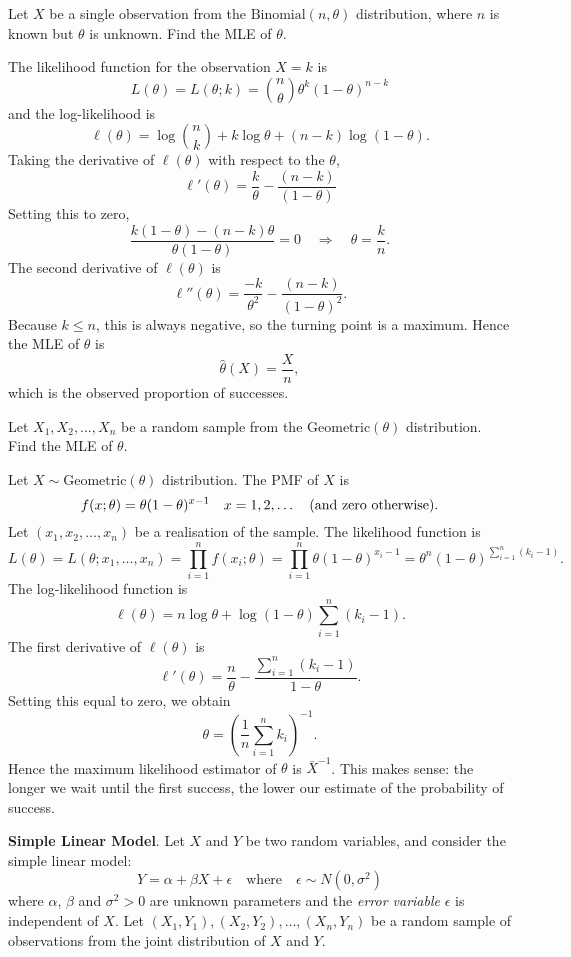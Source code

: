 \begin{exercise}
\begin{questions}
\question %
Let $X$ be a single observation from the $\text{Binomial}(n,\theta)$ distribution, where $n$ is known but $\theta$ is unknown. Find the MLE of $\theta$. 

\begin{answer}
The likelihood function for the observation $X=k$ is 
\[
L(\theta) = L(\theta; k) = \binom{n}{\theta} \theta^{k}(1 - \theta)^{n-k}
\]
and the log-likelihood is
\[
\ell(\theta) = \log \binom{n}{k} + k\log \theta + (n - k)\log(1 - \theta).
\]
Taking the derivative of $\ell(\theta)$ with respect to the $\theta$,
\[
\ell'(\theta) = \frac{k}{\theta} -\frac{(n-k)}{(1-\theta)} 
\]
Setting this to zero,
\[
\frac{k(1-\theta)-(n-k)\theta}{\theta(1-\theta)} = 0 \quad\Rightarrow\quad \theta=\frac{k}{n}.
\]
The second derivative of $\ell(\theta)$ is 
\[
\ell''(\theta) =  \frac{-k}{\theta^{2}} - \frac{(n-k)}{(1-\theta)^{2}}.
\]
Because $k\leq n$, this is always negative, so the turning point is a maximum. Hence the MLE of $\theta$ is 
\[
\hat{\theta}(X) = \frac{X}{n},
\]
which is the observed proportion of successes.
\end{answer}

\question %
Let $X_1,X_2,\ldots,X_n$ be a random sample from the $\text{Geometric}(\theta)$ distribution. Find the MLE of $\theta$. 
\begin{answer}
Let $X\sim\text{Geometric}(\theta)$ distribution. The PMF of $X$ is
\[
f(x;\theta) = \theta(1-\theta)^{x-1}\quad x = 1,2,\ldots \text{\quad (and zero otherwise).}
\]
Let $(x_1,x_2,\ldots,x_n)$ be a realisation of the sample. The likelihood function is
\[
L(\theta) = L(\theta;x_1,\ldots,x_n) 
	= \prod_{i=1}^n f(x_i;\theta)
	= \prod_{i=1}^n \theta(1-\theta)^{x_i-1}
	= \theta^n(1-\theta)^{\sum_{i=1}^{n}(k_i-1)}.
\]
The log-likelihood function is
\[
\ell(\theta) = n\log\theta +  \log(1-\theta)\sum_{i=1}^{n}(k_i-1).
\]
The first derivative of $\ell(\theta)$ is
\[
\ell'(\theta) = \frac{n}{\theta} - \frac{\sum_{i=1}^{n}(k_i-1)}{1-\theta}.
\]
Setting this equal to zero, we obtain
\[
\theta = \left(\frac{1}{n}\sum_{i=1}^n k_i\right)^{-1}.
\]
Hence the maximum likelihood estimator of $\theta$ is $\bar{X}^{-1}$. This makes sense: the longer we wait until the first success, the lower our estimate of the probability of success.
\end{answer}

\question %
\textbf{Simple Linear Model}. Let $X$ and $Y$ be two random variables, and consider the simple linear model:
\[
Y = \alpha + \beta X + \epsilon \quad\text{where}\quad \epsilon\sim N(0,\sigma^2)
\]
where $\alpha$, $\beta$ and $\sigma^2>0$ are unknown parameters and the \emph{error variable} $\epsilon$ is independent of $X$. Let $(X_1,Y_1),(X_2,Y_2),\ldots,(X_n,Y_n)$ be a random sample of observations from the joint distribution of $X$ and $Y$.
\begin{parts}

\end{parts}
\end{questions}
\end{exercise}
